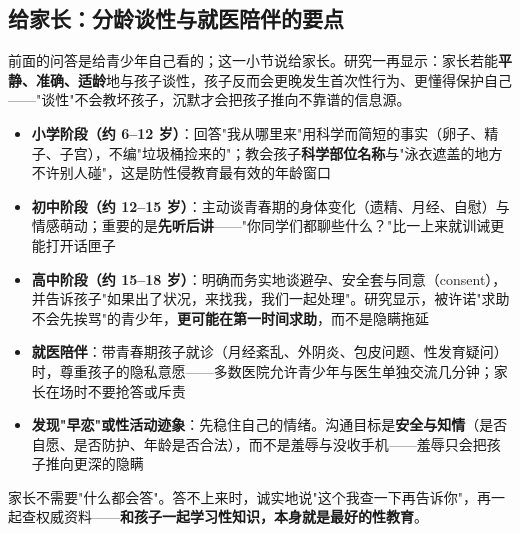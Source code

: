 \subsection{给家长：分龄谈性与就医陪伴的要点}

前面的问答是给青少年自己看的；这一小节说给家长。研究一再显示：家长若能\textbf{平静、准确、适龄}地与孩子谈性，孩子反而会更晚发生首次性行为、更懂得保护自己——"谈性"不会教坏孩子，沉默才会把孩子推向不靠谱的信息源。

\begin{itemize}
	\item \textbf{小学阶段（约 6--12 岁）}：回答"我从哪里来"用科学而简短的事实（卵子、精子、子宫），不编"垃圾桶捡来的"；教会孩子\textbf{科学部位名称}与"泳衣遮盖的地方不许别人碰"，这是防性侵教育最有效的年龄窗口
	\item \textbf{初中阶段（约 12--15 岁）}：主动谈青春期的身体变化（遗精、月经、自慰）与情感萌动；重要的是\textbf{先听后讲}——"你同学们都聊些什么？"比一上来就训诫更能打开话匣子
	\item \textbf{高中阶段（约 15--18 岁）}：明确而务实地谈避孕、安全套与同意（consent），并告诉孩子"如果出了状况，来找我，我们一起处理"。研究显示，被许诺"求助不会先挨骂"的青少年，\textbf{更可能在第一时间求助}，而不是隐瞒拖延
	\item \textbf{就医陪伴}：带青春期孩子就诊（月经紊乱、外阴炎、包皮问题、性发育疑问）时，尊重孩子的隐私意愿——多数医院允许青少年与医生单独交流几分钟；家长在场时不要抢答或斥责
	\item \textbf{发现"早恋"或性活动迹象}：先稳住自己的情绪。沟通目标是\textbf{安全与知情}（是否自愿、是否防护、年龄是否合法），而不是羞辱与没收手机——羞辱只会把孩子推向更深的隐瞒
\end{itemize}

\begin{tcolorbox}[colback=pink!5!white,colframe=red!50!black,title=贴心小叮咛]
家长不需要"什么都会答"。答不上来时，诚实地说"这个我查一下再告诉你"，再一起查权威资料——\textbf{和孩子一起学习性知识，本身就是最好的性教育}。
\end{tcolorbox}

